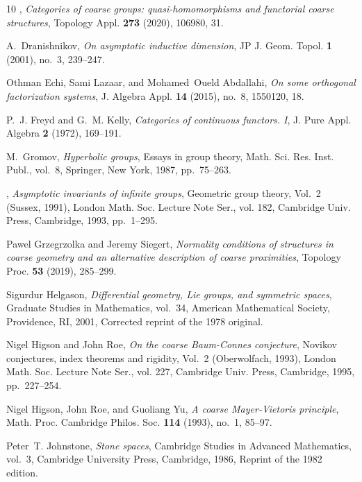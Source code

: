 \documentclass[12pt, a4paper]{amsart}
\theoremstyle{definition}
\begin{document}
\begin{thebibliography}{10}
\bysame, \emph{Categories of coarse groups: quasi-homomorphisms and functorial
  coarse structures}, Topology Appl. \textbf{273} (2020), 106980, 31.

A.~Dranishnikov, \emph{On asymptotic inductive dimension}, JP J. Geom. Topol.
  \textbf{1} (2001), no.~3, 239--247. 

Othman Echi, Sami Lazaar, and Mohamed~Oueld Abdallahi, \emph{On some orthogonal
  factorization systems}, J. Algebra Appl. \textbf{14} (2015), no.~8, 1550120,
  18. 

P.~J. Freyd and G.~M. Kelly, \emph{Categories of continuous functors. {I}}, J.
  Pure Appl. Algebra \textbf{2} (1972), 169--191. 

M.~Gromov, \emph{Hyperbolic groups}, Essays in group theory, Math. Sci. Res.
  Inst. Publ., vol.~8, Springer, New York, 1987, pp.~75--263. 

\bysame, \emph{Asymptotic invariants of infinite groups}, Geometric group
  theory, {V}ol.\ 2 ({S}ussex, 1991), London Math. Soc. Lecture Note Ser., vol.
  182, Cambridge Univ. Press, Cambridge, 1993, pp.~1--295. 

Pawel Grzegrzolka and Jeremy Siegert, \emph{Normality conditions of structures
  in coarse geometry and an alternative description of coarse proximities},
  Topology Proc. \textbf{53} (2019), 285--299. 

Sigurdur Helgason, \emph{Differential geometry, {L}ie groups, and symmetric
  spaces}, Graduate Studies in Mathematics, vol.~34, American Mathematical
  Society, Providence, RI, 2001, Corrected reprint of the 1978 original.

Nigel Higson and John Roe, \emph{On the coarse {B}aum-{C}onnes conjecture},
  Novikov conjectures, index theorems and rigidity, {V}ol.\ 2 ({O}berwolfach,
  1993), London Math. Soc. Lecture Note Ser., vol. 227, Cambridge Univ. Press,
  Cambridge, 1995, pp.~227--254. 

Nigel Higson, John Roe, and Guoliang Yu, \emph{A coarse {M}ayer-{V}ietoris
  principle}, Math. Proc. Cambridge Philos. Soc. \textbf{114} (1993), no.~1,
  85--97. 

Peter~T. Johnstone, \emph{Stone spaces}, Cambridge Studies in Advanced
  Mathematics, vol.~3, Cambridge University Press, Cambridge, 1986, Reprint of
  the 1982 edition. 


\end{thebibliography}
\end{document}
